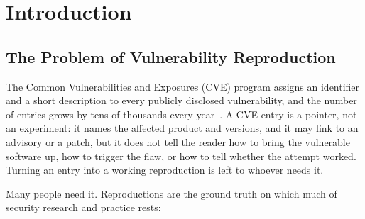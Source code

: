 \section{Introduction}
\label{sec:intro}

\subsection{The Problem of Vulnerability Reproduction}

The Common Vulnerabilities and Exposures (CVE) program assigns an identifier
and a short description to every publicly disclosed vulnerability, and the
number of entries grows by tens of thousands every year~\cite{cve,nvd}. A CVE
entry is a pointer, not an experiment: it names the affected product and
versions, and it may link to an advisory or a patch, but it does not tell the
reader how to bring the vulnerable software up, how to trigger the flaw, or
how to tell whether the attempt worked. Turning an entry into a working
reproduction is left to whoever needs it.

Many people need it. Reproductions are the ground truth on which much of
security research and practice rests:

